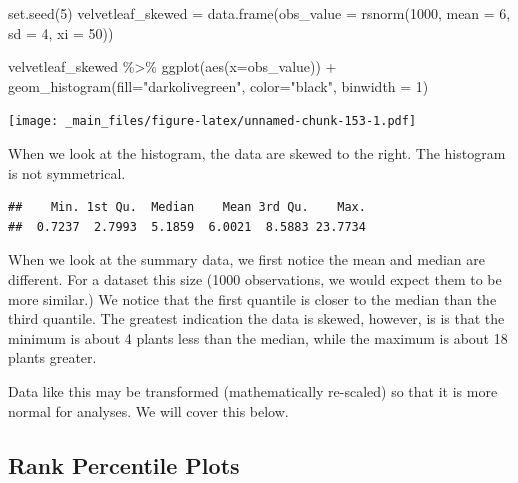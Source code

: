 \documentclass[
]{book}
\newenvironment{Shaded}{\begin{snugshade}}{\end{snugshade}}
\newcommand{\AttributeTok}[1]{\textcolor[rgb]{0.77,0.63,0.00}{#1}}
\newcommand{\DecValTok}[1]{\textcolor[rgb]{0.00,0.00,0.81}{#1}}
\newcommand{\FunctionTok}[1]{\textcolor[rgb]{0.00,0.00,0.00}{#1}}
\newcommand{\NormalTok}[1]{#1}
\newcommand{\OtherTok}[1]{\textcolor[rgb]{0.56,0.35,0.01}{#1}}
\newcommand{\SpecialCharTok}[1]{\textcolor[rgb]{0.00,0.00,0.00}{#1}}
\newcommand{\StringTok}[1]{\textcolor[rgb]{0.31,0.60,0.02}{#1}}
\begin{document}
\begin{Shaded}
\begin{Highlighting}[]
\FunctionTok{set.seed}\NormalTok{(}\DecValTok{5}\NormalTok{)}
\NormalTok{velvetleaf\_skewed }\OtherTok{=} \FunctionTok{data.frame}\NormalTok{(}\AttributeTok{obs\_value =} \FunctionTok{rsnorm}\NormalTok{(}\DecValTok{1000}\NormalTok{, }\AttributeTok{mean =} \DecValTok{6}\NormalTok{, }\AttributeTok{sd =} \DecValTok{4}\NormalTok{, }\AttributeTok{xi =} \DecValTok{50}\NormalTok{)) }

\NormalTok{velvetleaf\_skewed }\SpecialCharTok{\%\textgreater{}\%}
  \FunctionTok{ggplot}\NormalTok{(}\FunctionTok{aes}\NormalTok{(}\AttributeTok{x=}\NormalTok{obs\_value)) }\SpecialCharTok{+}
  \FunctionTok{geom\_histogram}\NormalTok{(}\AttributeTok{fill=}\StringTok{"darkolivegreen"}\NormalTok{, }\AttributeTok{color=}\StringTok{"black"}\NormalTok{, }\AttributeTok{binwidth =} \DecValTok{1}\NormalTok{) }
\end{Highlighting}
\end{Shaded}

\texttt{[image: \_main\_files/figure-latex/unnamed-chunk-153-1.pdf]}

When we look at the histogram, the data are skewed to the right. The histogram is not symmetrical.

\begin{Shaded}
\end{Shaded}

\begin{verbatim}
##    Min. 1st Qu.  Median    Mean 3rd Qu.    Max. 
##  0.7237  2.7993  5.1859  6.0021  8.5883 23.7734
\end{verbatim}

When we look at the summary data, we first notice the mean and median are different. For a dataset this size (1000 observations, we would expect them to be more similar.) We notice that the first quantile is closer to the median than the third quantile. The greatest indication the data is skewed, however, is is that the minimum is about 4 plants less than the median, while the maximum is about 18 plants greater.

Data like this may be transformed (mathematically re-scaled) so that it is more normal for analyses. We will cover this below.

\hypertarget{rank-percentile-plots}{%
\subsection{Rank Percentile Plots}\label{rank-percentile-plots}}
\end{document}

